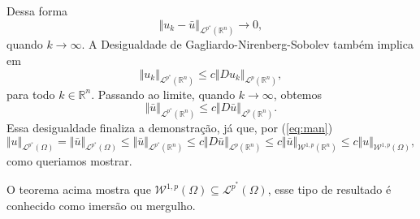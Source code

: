 \documentclass[a4paper, 11pt]{book}
\theoremstyle{definition}
\newcommand{\bR}{\mathbb{R}}
\newcommand{\cL}{\mathcal{L}}
\newcommand{\cW}{\mathcal{W}}
\begin{document}
\begin{prf}
    Dessa forma
    \[
        \Vert u_k - \bar u \Vert_{\cL^{p^*}(\bR^n)} \to 0,
    \]
    quando $k \to \infty$.
    A Desigualdade de Gagliardo-Nirenberg-Sobolev também implica em
    \[  
        \Vert u_k \Vert_{\cL^{p^*}(\bR^n)} \leqslant c \Vert Du_k \Vert_{\cL^p(\bR^n)},
    \]
    para todo $k \in \bR^n$.
    Passando ao limite, quando $k \to \infty$, obtemos
    \[
        \Vert \bar u \Vert_{\cL^{p^*}(\bR^n)} \leqslant c \Vert D \bar u \Vert_{\cL^p(\bR^n)}.
    \]
    Essa desigualdade finaliza a demonstração, já que, por (\ref{eq:man})
    \[
        \Vert u \Vert_{\cL^{p^*}(\Omega)} = \Vert \bar u \Vert_{\cL^{p^*}(\Omega)} \leqslant \Vert \bar u \Vert_{\cL^{p^*}(\bR^n)} \leqslant c \Vert D \bar u \Vert_{\cL^p(\bR^n)} \leqslant c \Vert \bar u \Vert_{\cW^{1,p}(\bR^n)} \leqslant c \Vert u \Vert_{\cW^{1,p}(\Omega)},
    \]
    como queriamos mostrar.
\end{prf}

O teorema acima mostra que $\cW^{1,p}(\Omega) \subseteq \cL^{p^*}(\Omega)$, esse tipo de resultado é conhecido como imersão ou mergulho.
\end{document}
